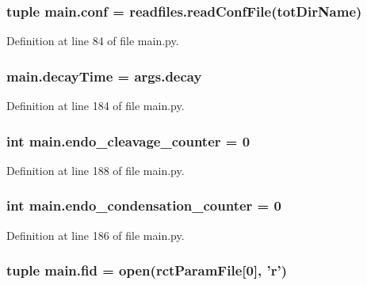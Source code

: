 \hypertarget{a00117_adc567db25548116293968a9102beab98}{
\subsubsection[{conf}]{\setlength{\rightskip}{0pt plus 5cm}tuple main.\-conf = readfiles.\-read\-Conf\-File({\bf tot\-Dir\-Name})}}\label{a00117_adc567db25548116293968a9102beab98}


Definition at line 84 of file main.\-py.

\hypertarget{a00117_a5517c07ae046c271d6291e9b3f7d139d}{
\subsubsection[{decay\-Time}]{\setlength{\rightskip}{0pt plus 5cm}main.\-decay\-Time = args.\-decay}}\label{a00117_a5517c07ae046c271d6291e9b3f7d139d}


Definition at line 184 of file main.\-py.

\hypertarget{a00117_a17b22b48a2afe0223186b4275fe5ba70}{
\subsubsection[{endo\-\_\-cleavage\-\_\-counter}]{\setlength{\rightskip}{0pt plus 5cm}int main.\-endo\-\_\-cleavage\-\_\-counter = 0}}\label{a00117_a17b22b48a2afe0223186b4275fe5ba70}


Definition at line 188 of file main.\-py.

\hypertarget{a00117_a0521d81d319c4d79433b5fb65a6da1c2}{
\subsubsection[{endo\-\_\-condensation\-\_\-counter}]{\setlength{\rightskip}{0pt plus 5cm}int main.\-endo\-\_\-condensation\-\_\-counter = 0}}\label{a00117_a0521d81d319c4d79433b5fb65a6da1c2}


Definition at line 186 of file main.\-py.

\hypertarget{a00117_a68ab0ffa4b5ff1cceff01f4abe686ad0}{
\subsubsection[{fid}]{\setlength{\rightskip}{0pt plus 5cm}tuple main.\-fid = open({\bf rct\-Param\-File}\mbox{[}0\mbox{]}, '{\bf r}')}}\label{a00117_a68ab0ffa4b5ff1cceff01f4abe686ad0}


